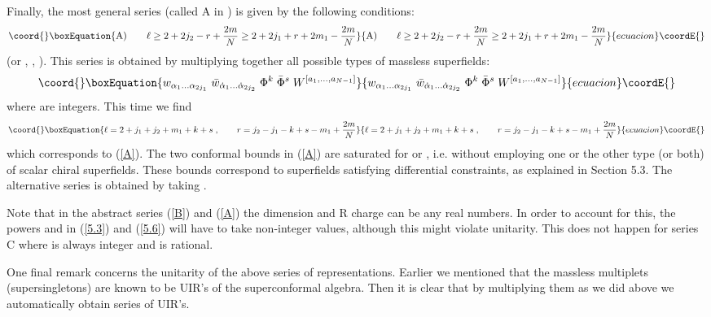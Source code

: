 \documentclass[a4paper,12pt]{article}
\begin{document}
Finally, the most general series (called A in \cite{FS1}) is 
given by the following conditions: 
\begin{equation}\coord{}\boxEquation{\label{A}
  {\rm A)}\qquad   \ell \geq  2+2j_2-r+{2m\over N}\geq 2+2j_1+r+2m_1-{2m\over 
N}  
}{{\rm A)}\qquad   \ell \geq  2+2j_2-r+{2m\over N}\geq 2+2j_1+r+2m_1-{2m\over 
N}  
}{ecuacion}\coordE{}\end{equation}
(or  \coordHE{}, \coordHE{}, \coordHE{}).
This series is obtained by multiplying together all possible types 
of  massless superfields:   
\begin{equation}\coord{}\boxEquation{\label{5.6}
  w_{\alpha_1\ldots\alpha_{2j_1}}\;\bar 
w_{\dot\alpha_1\ldots\dot\alpha_{2j_2}}\; \Phi^k\; \bar\Phi^s\;  
W^{[a_1,\ldots,a_{N-1}]} 
}{w_{\alpha_1\ldots\alpha_{2j_1}}\;\bar 
w_{\dot\alpha_1\ldots\dot\alpha_{2j_2}}\; \Phi^k\; \bar\Phi^s\;  
W^{[a_1,\ldots,a_{N-1}]} 
}{ecuacion}\coordE{}\end{equation}
where \coordHE{} are integers. This time we find
\begin{equation}\coord{}\boxEquation{\label{5.7}
  \ell = 2+j_1+j_2+m_1+k+s\;, \qquad r=j_2-j_1-k+s-m_1+{2m\over 
N} 
}{\ell = 2+j_1+j_2+m_1+k+s\;, \qquad r=j_2-j_1-k+s-m_1+{2m\over 
N} 
}{ecuacion}\coordE{}\end{equation}
which corresponds to (\ref{A}). The two conformal bounds in  
(\ref{A}) are saturated for \coordHE{} or \coordHE{}, i.e. without 
employing one or the other type (or both) of scalar chiral 
superfields. These bounds correspond to superfields satisfying 
differential constraints, as explained in Section 5.3. The 
alternative series is obtained by taking \coordHE{}. 

Note that in the abstract series (\ref{B}) and (\ref{A}) the 
dimension \myHighlight{$\ell$}\coordHE{} and R charge \coordHE{} can be any real numbers. In 
order to account for this, the powers \coordHE{} and \coordHE{} in (\ref{5.3}) 
and (\ref{5.6}) will have to take non-integer values, although 
this might violate unitarity. This does not happen for series C 
where \myHighlight{$\ell$}\coordHE{} is always integer and \coordHE{} is rational. 

One final remark concerns the unitarity of the above series of 
representations. Earlier we mentioned that the massless multiplets 
(supersingletons) are known to be UIR's of the superconformal 
algebra. Then it is clear that by multiplying them as we did above 
we automatically obtain series of UIR's. 
\end{document}
